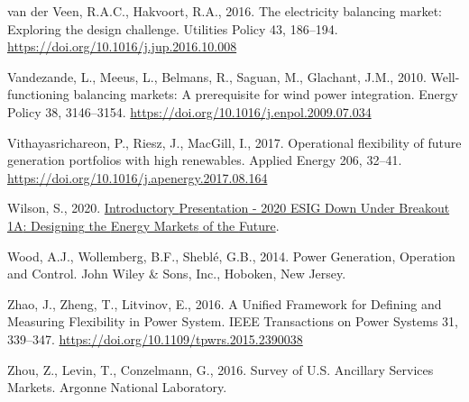 \documentclass[12pt,a4paper,]{report}
\newlength{\cslhangindent}
\newenvironment{CSLReferences}[2] %
 {%
  \setlength{\parindent}{0pt}
  \ifodd #1 \everypar{\setlength{\hangindent}{\cslhangindent}}\ignorespaces\fi
  \ifnum #2 > 0
  \setlength{\parskip}{#2\baselineskip}
  \fi
 }%
 {}
\begin{document}
\begin{CSLReferences}{1}{0}
\leavevmode{}%
van der Veen, R.A.C., Hakvoort, R.A., 2016. The electricity balancing
market: {Exploring} the design challenge. Utilities Policy 43, 186--194.
\url{https://doi.org/10.1016/j.jup.2016.10.008}

\leavevmode{}%
Vandezande, L., Meeus, L., Belmans, R., Saguan, M., Glachant, J.M.,
2010. Well-functioning balancing markets: {A} prerequisite for wind
power integration. Energy Policy 38, 3146--3154.
\url{https://doi.org/10.1016/j.enpol.2009.07.034}

\leavevmode{}%
Vithayasrichareon, P., Riesz, J., MacGill, I., 2017. Operational
flexibility of future generation portfolios with high renewables.
Applied Energy 206, 32--41.
\url{https://doi.org/10.1016/j.apenergy.2017.08.164}

\leavevmode{}%
Wilson, S., 2020.
\href{https://www.youtube.com/watch?v=LpYnKVC9hGY&feature=youtu.be}{Introductory
{Presentation} - 2020 {ESIG Down Under Breakout 1A}: {Designing} the
{Energy Markets} of the {Future}}.

\leavevmode{}%
Wood, A.J., Wollemberg, B.F., Sheblé, G.B., 2014. Power {Generation},
{Operation} and {Control}. {John Wiley \& Sons, Inc.}, {Hoboken, New
Jersey}.

\leavevmode{}%
Zhao, J., Zheng, T., Litvinov, E., 2016. A {Unified Framework} for
{Defining} and {Measuring Flexibility} in {Power System}. IEEE
Transactions on Power Systems 31, 339--347.
\url{https://doi.org/10.1109/tpwrs.2015.2390038}

\leavevmode{}%
Zhou, Z., Levin, T., Conzelmann, G., 2016. Survey of {U}.{S}. {Ancillary
Services Markets}. {Argonne National Laboratory}.

\end{CSLReferences}
\end{document}
